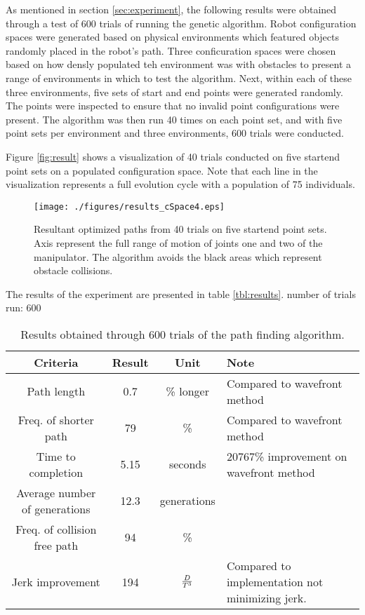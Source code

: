 
As mentioned in section \ref{sec:experiment}, the following results were obtained through a test of 600 trials of running the genetic algorithm. Robot configuration spaces were generated based on physical environments which featured objects randomly placed in the robot's path. Three conficuration spaces were chosen based on how densly populated teh environment was with obstacles to present a range of environments in which to test the algorithm. Next, within each of these three environments, five sets of start and end points were generated randomly. The points were inspected to ensure that no invalid point configurations were present. The algorithm was then run 40 times on each point set, and with five point sets per environment and three environments, 600 trials were conducted.

Figure \ref{fig:result} shows a visualization of 40 trials conducted on five start\/end point sets on a populated configuration space. Note that each line in the visualization represents a full evolution cycle with a population of 75 individuals.

\begin{figure}[h] \label{fig:result}
	\centering
	\texttt{[image: ./figures/results\_cSpace4.eps]}
	\caption{Resultant optimized paths from 40 trials on five start\/end point sets. Axis represent the full range of motion of joints one and two of the manipulator. The algorithm avoids the black areas which represent obstacle collisions.}
	\label{fig:ws2cs}
\end{figure}

The results of the experiment are presented in table \ref{tbl:results}.
number of trials run: 600

\begin{table}
\renewcommand{\arraystretch}{1.3}
\caption{Results obtained through 600 trials of the path finding algorithm.}
\label{table_example}
\begin{center}
		\begin{tabular}{ c | c  c  p{2cm} }
		Criteria & Result & Unit & Note \\ \hline
		Path length & 0.7 & \% longer & Compared to wavefront method \\ 
		Freq. of shorter path & 79 & \% & Compared to wavefront method \\ 
		Time to completion & 5.15 & seconds & 20767\% improvement on wavefront method \\ 
		Average number of generations & 12.3 & generations & \\ 
		Freq. of collision free path & 94 & \% &  \\ 
		Jerk improvement & 194 & ${{D}\over{T^3}}$ & Compared to implementation not minimizing jerk.\\ 
\end{tabular}
\end{center}
\end{table}


